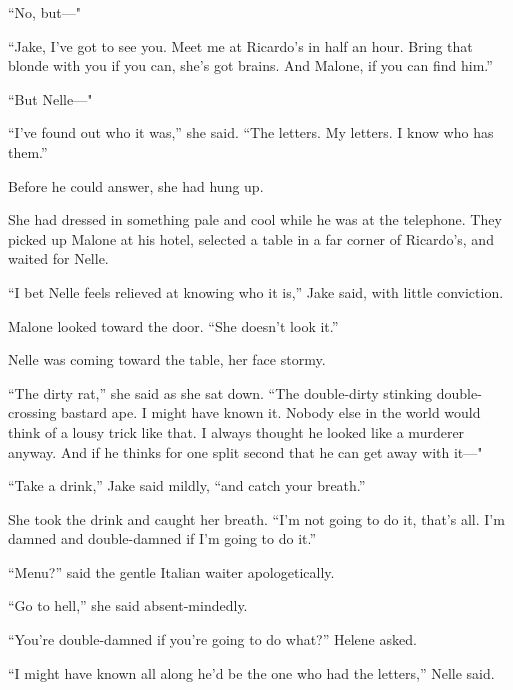 \documentclass{novel}
\begin{document}
“No, but—"

“Jake, I've got to see you. Meet me at Ricardo’s in half an hour. Bring that blonde with you if you can, she’s got brains. And Malone, if you can find him.”

“But Nelle—"

“I've found out who it was,” she said. “The letters. My letters. I know who has them.”

Before he could answer, she had hung up.

\vspace{2\nbs}
\clearpage
\thispagestyle{empty}

\begin{ChapterStart}
\vspace{3\nbs}
\end{ChapterStart}

She had dressed in something pale and cool while he was at the telephone. They picked up Malone at his hotel, selected a table in a far corner of Ricardo’s, and waited for Nelle.

“I bet Nelle feels relieved at knowing who it is,” Jake said, with little conviction.

Malone looked toward the door. “She doesn’t look it.”

Nelle was coming toward the table, her face stormy.

“The dirty rat,” she said as she sat down. “The double-dirty stinking double-crossing bastard ape. I might have known it. Nobody else in the world would think of a lousy trick like that. I always thought he looked like a murderer anyway. And if he thinks for one split second that he can get away with it—"

“Take a drink,” Jake said mildly, “and catch your breath.”

She took the drink and caught her breath. “I'm not going to do it, that’s all. I’m damned and double-damned if I’m going to do it.”

“Menu?” said the gentle Italian waiter apologetically.

“Go to hell,” she said absent-mindedly.

“You’re double-damned if you’re going to do what?” Helene asked.

“I might have known all along he’d be the one who had the letters,” Nelle said.
\end{document}
